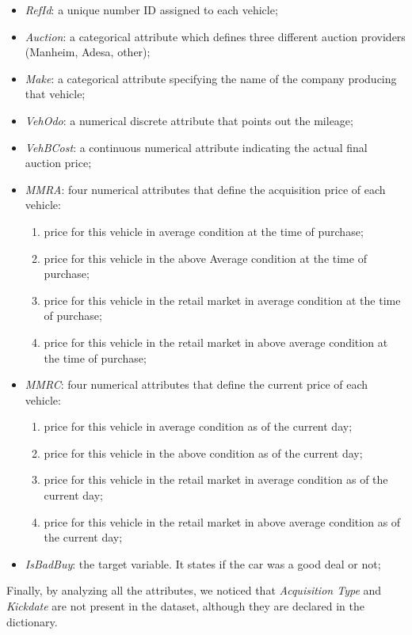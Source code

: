 \documentclass{article}
\begin{document}
	\begin{itemize}
		\item \emph{RefId}: a unique number ID assigned to each vehicle;
		\item \emph{Auction}: a categorical attribute which defines three different auction providers (Manheim, Adesa, other);
		\item \emph{Make}: a categorical attribute specifying the name of the company producing that vehicle;
		\item \emph{VehOdo}: a numerical discrete attribute that points out the mileage;
		\item \emph{VehBCost}: a continuous numerical attribute indicating the actual final auction price;
		\item \emph{MMRA}: four numerical attributes that define the acquisition price of each vehicle:
		\begin{enumerate}
			\item price for this vehicle in average condition at the time of purchase; 
			\item price for this vehicle in the above Average condition at the time of purchase;
			\item price for this vehicle in the retail market in average condition at the time of purchase;
			\item price for this vehicle in the retail market in above average condition at the time of purchase;
		\end{enumerate}
		\item \emph{MMRC}: four numerical attributes that define the current price of each vehicle:
		\begin{enumerate}
			\item price for this vehicle in average condition as of the current day;
			\item price for this vehicle in the above condition as of the current day;
			\item price for this vehicle in the retail market in average condition as of the current day;
			\item price for this vehicle in the retail market in above average condition as of the current day;
		\end{enumerate}
		\item \emph{IsBadBuy}: the target variable. It states if the car was a good deal or not;
	\end{itemize}
	
	Finally, by analyzing all the attributes, we noticed that \emph{Acquisition Type} and \emph{Kickdate} are not present in the dataset, although they are declared in the dictionary.
	
\end{document}
